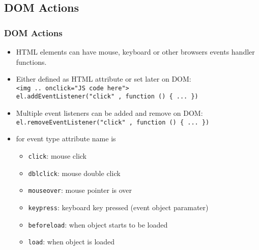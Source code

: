 \documentclass[trans,compress,xcolor=table]{beamer}
\begin{document}
\subsection*{DOM Actions}
\begin{frame}[fragile]
\frametitle{DOM Actions}
\begin{itemize}
\item HTML elements can have mouse, keyboard or other
browsers events handler functions.
\item Either defined as HTML attribute or set later on DOM:\\
	\lstinline!<img .. onclick="JS code here">!\\
	\lstinline!el.addEventListener("click" , function () { ... })!
\item Multiple event listeners can be added and remove on DOM:\\
	\lstinline!el.removeEventListener("click" , function () { ... })!
\item for event type  attribute name is 
\begin{itemize}
\item \lstinline!click!: mouse click
\item \lstinline!dblclick!: mouse double click
\item \lstinline!mouseover!: mouse pointer is over
\item \lstinline!keypress!: keyboard key pressed (event object paramater)
\item \lstinline!beforeload!: when object starts to be loaded
\item \lstinline!load!: when object is loaded
\end{itemize}
\end{itemize}
\end{frame}
\end{document}
